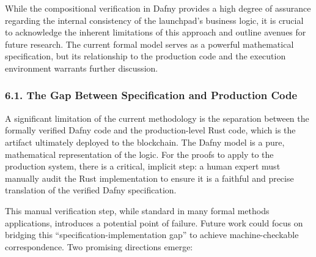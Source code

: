 \documentclass[
  english,
  onecolumn]{article}
\begin{document}
While the compositional verification in Dafny provides a high degree of
assurance regarding the internal consistency of the launchpad's business
logic, it is crucial to acknowledge the inherent limitations of this
approach and outline avenues for future research. The current formal
model serves as a powerful mathematical specification, but its
relationship to the production code and the execution environment
warrants further discussion.

\subsubsection{6.1. The Gap Between Specification and Production
Code}\label{the-gap-between-specification-and-production-code}

A significant limitation of the current methodology is the separation
between the formally verified Dafny code and the production-level Rust
code, which is the artifact ultimately deployed to the blockchain. The
Dafny model is a pure, mathematical representation of the logic. For the
proofs to apply to the production system, there is a critical, implicit
step: a human expert must manually audit the Rust implementation to
ensure it is a faithful and precise translation of the verified Dafny
specification.

This manual verification step, while standard in many formal methods
applications, introduces a potential point of failure. Future work could
focus on bridging this ``specification-implementation gap'' to achieve
machine-checkable correspondence. Two promising directions emerge:
\end{document}
